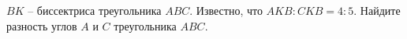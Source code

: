 \begin{ex}
	\begin{condition}
		\( BK \) – биссектриса треугольника \( ABC \). Известно, что \( AKB : CKB = 4 : 5  \). Найдите разность углов \( A  \) и \( C \) треугольника \( ABC \).
	\end{condition}
\end{ex}